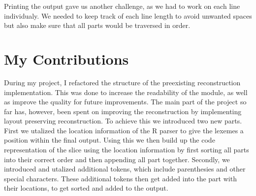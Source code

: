 \documentclass[a3paper, portrait, english, default]{uulm-cs-poster}
\begin{document}
\begin{multicols}{2}
Printing the output gave us another challenge, as we had to work on each line individualy. We needed to keep track of each line length to avoid unwanted spaces but also make sure that all parts would be traversed in order.
\end{multicols}
\section*{My Contributions}
\begin{multicols}{4}
	During my project, I refactored the structure of the preexisting reconstruction implementation. This was done to increase the readability of the module, as well as improve the quality for future improvements. The main part of the project so far has, however, been spent on improving the reconstruction by implementing layout preserving reconstruction.
	To achieve this we introduced two new parts. First we utalized the location information of the R parser to give the lexemes a position within the final output. Using this we then build up the code representation of the slice using the location information by first sorting all parts into their correct order and then appending all part together.
	Secondly, we introduced and utalized additional tokens, which include parenthesies and other special characters. These additional tokens then get added into the part with their locations, to get sorted and added to the output.
\end{multicols}
\end{document}

